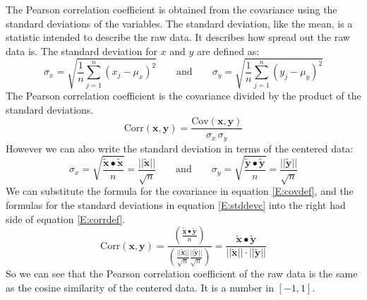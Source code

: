    The Pearson correlation coefficient is obtained from the covariance using
the standard deviations of the variables.  The standard deviation, like the 
mean, is a statistic intended to describe the raw data.  It describes how 
spread out the raw data is.  The standard deviation for $x$ and $y$ are defined
as:
\begin{equation}
    \sigma_x = \sqrt{ \frac{1}{n} \sum_{j=1}^n (x_j - \mu_x)^2} 
\qquad \mbox{and} \qquad 
    \sigma_y = \sqrt{ \frac{1}{n} \sum_{j=1}^n (y_j - \mu_y)^2}
\end{equation}
The Pearson correlation coefficient is the covariance divided by the product of
the standard deviations.
\begin{equation}\label{E:corrdef}
\mathrm{Corr}(\mathbf{x}, \mathbf{y}) = 
\frac{\mathrm{Cov}(\mathbf{x}, \mathbf{y})}{\sigma_x \, \sigma_y}
\end{equation}
However we can also write the standard deviation in terms of the centered data:
\begin{equation}\label{E:stddevc}
  \sigma_x = \sqrt{ \frac{\tilde{\mathbf{x}} \bullet \tilde{\mathbf{x}}}{n}}
= \frac{||\tilde{\mathbf{x}}||}{\sqrt{n}}
\qquad \mbox{and} \qquad 
  \sigma_y = \sqrt{ \frac{\tilde{\mathbf{y}} \bullet \tilde{\mathbf{y}}}{n}}
= \frac{||\tilde{\mathbf{y}}||}{\sqrt{n}}
\end{equation}
We can substitute the formula for the covariance in equation \eqref{E:covdef},
and the formulas for the standard deviations in equation \eqref{E:stddevc}
into the right had side of equation \eqref{E:corrdef}.
\begin{equation}
\mathrm{Corr}(\mathbf{x}, \mathbf{y}) = 
\frac{\left(\displaystyle{\frac{\tilde{\mathbf{x}} \bullet 
                                                 \tilde{\mathbf{y}}}{n}}\right)}
     {\left(\displaystyle{\frac{||\tilde{\mathbf{x}}||}{\sqrt{n}}
               \frac{||\tilde{\mathbf{y}}||}{\sqrt{n}} }\right)}
= \frac{\tilde{\mathbf{x}} \bullet \tilde{\mathbf{y}}}
       {||\tilde{\mathbf{x}}|| \cdot ||\tilde{\mathbf{y}}||} 
\end{equation}
So we can see that the Pearson correlation coefficient of the raw data is the
same as the cosine similarity of the centered data.  It is a number in 
$[-1,1]$.  

